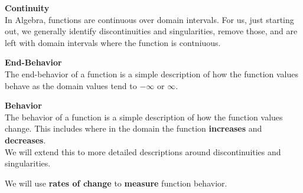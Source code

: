 \documentclass{ximera}
\begin{document}
\begin{explanation}  \textbf{\textcolor{blue!75!black}{Continuity}} \\

In Algebra, functions are continuous over domain intervals.  For us, just starting out, we generally identify discontinuities and singularities, remove those, and are left with domain intervals where the function is contniuous.

\end{explanation}







\begin{explanation}  \textbf{\textcolor{blue!75!black}{End-Behavior}} \\

The end-behavior of a function is a simple description of how the function values behave as the domain values tend to $-\infty$ or $\infty$.

\end{explanation}









\begin{explanation}  \textbf{\textcolor{blue!75!black}{Behavior}} \\

The behavior of a function is a simple description of how the function values change.  This includes where in the domain the function \textbf{\textcolor{purple!85!blue}{increases}} and \textbf{\textcolor{purple!85!blue}{decreases}}. \\


We will extend this to more detailed descriptions around discontinuities and singularities.


We will use \textbf{rates of change} to \textbf{measure} function behavior.

\end{explanation}
\end{document}
